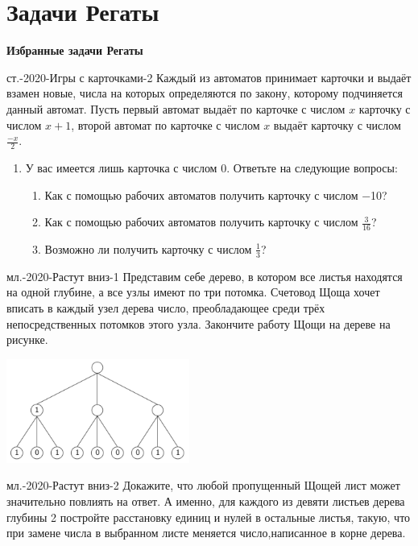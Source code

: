 \documentclass[aspectratio=1610,11pt]{beamer}
\newcommand\fram[2]{\begin{frame}{\bf #1} #2 \end{frame}}
\newcommand\framm[1]{\begin{frame} #1 \end{frame}}
\def\usl#1#2{\begin{block}{#1} #2 \end{block} \medskip\pause}
\def\uslnp#1#2{\begin{block}{#1} #2 \end{block} \medskip}
\begin{document}
\section{Задачи Регаты}
\fram{Избранные задачи Регаты}{
\uslnp{ст.-2020-Игры с карточками-2}{
Каждый из автоматов принимает карточки и выдаёт взамен новые, числа на которых определяются по закону, которому подчиняется данный автомат. Пусть первый автомат выдаёт по карточке с числом $x$ карточку с числом $x+1$, второй автомат по карточке с числом $x$ выдаёт карточку с числом $\frac{-x}{2}$.
\begin{enumerate}
	\item У вас имеется лишь карточка с числом 0. Ответьте на следующие вопросы:
	\begin{enumerate}
		\item Как с помощью рабочих автоматов получить карточку с числом −10?
		\item Как с помощью рабочих автоматов получить карточку с числом $\frac{3}{16}$?
		\item Возможно ли получить карточку с числом $\frac{1}{3}$?
	\end{enumerate}
\end{enumerate}
}
}

\framm{
\usl{мл.-2020-Растут вниз-1}{
Представим себе дерево, в котором все листья находятся на одной глубине, а все узлы имеют по три потомка. Счетовод Щоща хочет вписать в каждый узел дерева число, преобладающее среди трёх непосредственных потомков этого узла. Закончите работу Щощи на дереве на рисунке.
}\vspace{-4mm}
\begin{center}
	\includegraphics[width=6cm]{tree-1}
\end{center}
}

\framm{
\uslnp{мл.-2020-Растут вниз-2}{
Докажите, что любой пропущенный Щощей лист может значительно повлиять на ответ. А именно, для каждого из девяти листьев дерева глубины 2 постройте расстановку единиц и нулей в остальные листья, такую, что при замене числа в выбранном листе меняется число,написанное в корне дерева.
}
}
\end{document}
